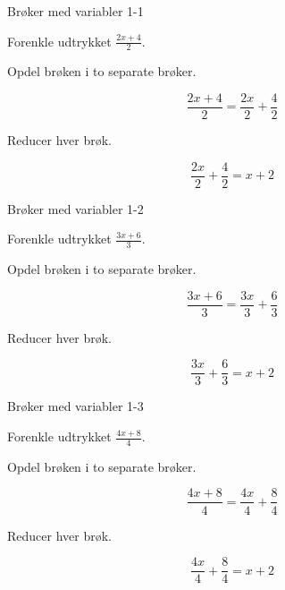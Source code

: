 \documentclass{article}
\begin{document}

\tableofcontents
\newpage

\begin{exercise}{Brøker med variabler 1-1}

Forenkle udtrykket $\frac{2x + 4}{2}$.


\hint

Opdel brøken i to separate brøker.

\hint
\[
\frac{2x + 4}{2} = \frac{2x}{2} + \frac{4}{2}
\]

\hint

Reducer hver brøk.

\hint
\[
\frac{2x}{2} + \frac{4}{2} = x + 2
\]

\end{exercise}

\newpage

\begin{exercise}{Brøker med variabler 1-2}

Forenkle udtrykket $\frac{3x + 6}{3}$.


\hint

Opdel brøken i to separate brøker.

\hint
\[
\frac{3x + 6}{3} = \frac{3x}{3} + \frac{6}{3}
\]

\hint

Reducer hver brøk.

\hint
\[
\frac{3x}{3} + \frac{6}{3} = x + 2
\]

\end{exercise}

\newpage

\begin{exercise}{Brøker med variabler 1-3}

Forenkle udtrykket $\frac{4x + 8}{4}$.


\hint

Opdel brøken i to separate brøker.

\hint
\[
\frac{4x + 8}{4} = \frac{4x}{4} + \frac{8}{4}
\]

\hint

Reducer hver brøk.

\hint
\[
\frac{4x}{4} + \frac{8}{4} = x + 2
\]

\end{exercise}

\newpage
\end{document}
